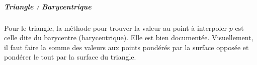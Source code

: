 \subparagraph{Triangle : Barycentrique}

Pour le triangle, la méthode pour trouver la valeur au point à interpoler \( p \) est celle dite du barycentre (barycentrique).
Elle est bien documentée.
Visuellement, il faut faire la somme des valeurs aux points pondérés par la surface opposée et pondérer le tout par la surface du triangle.

